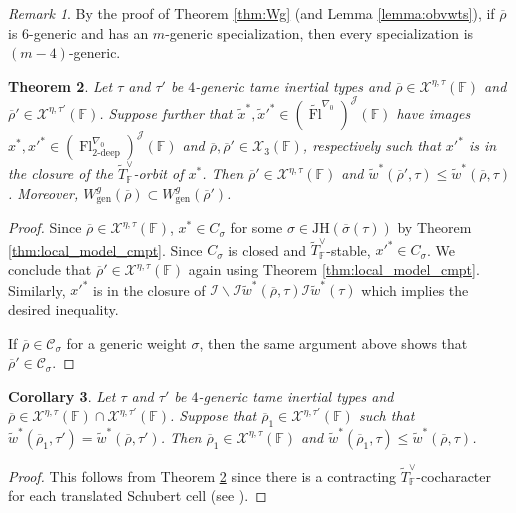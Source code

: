 \documentclass[oneside,a4paper,english, 11pt]{amsart}
\theoremstyle{plain}
\newtheorem{thm}{Theorem}[subsection]
\theoremstyle{plain}
\theoremstyle{plain}
\theoremstyle{plain}
\theoremstyle{plain}
\theoremstyle{plain}
\newtheorem{cor}[thm]{Corollary}
\theoremstyle{definition}
\theoremstyle{definition}
\theoremstyle{definition}
\theoremstyle{remark}
\newtheorem{rmk}[thm]{Remark}
\numberwithin{equation}{section}
\newcommand{\F}{\mathbb{F}}
\newcommand{\cC}{\mathcal{C}}
\newcommand{\cI}{\mathcal{I}}
\newcommand{\cJ}{\mathcal{J}}
\newcommand{\cX}{\mathcal{X}}
\newcommand{\tld}[1]{\widetilde{#1}}
\newcommand{\JH}{\mathrm{JH}}
\newcommand{\rhobar}{\overline{\rho}}
\newcommand{\ovl}[1]{\overline{#1}}
\DeclareMathOperator{\Fl}{Fl}
\begin{document}
\begin{rmk}\label{rmk:genbound}
By the proof of Theorem \ref{thm:Wg} (and Lemma \ref{lemma:obvwts}), if $\rhobar$ is $6$-generic and has an $m$-generic specialization, then every specialization is $(m-4)$-generic.  
\end{rmk}

\begin{thm}\label{thm:semicont}
Let $\tau$ and $\tau'$ be $4$-generic tame inertial types and $\rhobar \in \cX^{\eta,\tau}(\F)$ and $\rhobar' \in \cX^{\eta,\tau'}(\F)$. 
Suppose further that $\tld{x}^*,\tld{x}'^* \in (\tld{\Fl}^{\nabla_0})^{\cJ}(\F)$ have images $x^*,{x'}^* \in (\Fl_{2\textrm{-deep}}^{\nabla_0})^{\cJ}(\F)$ and $\rhobar,\rhobar' \in \cX_3(\F)$, respectively such that ${x'}^*$ is in the closure of the $\tld{T}^{\vee}_\F$-orbit of $x^*$. 
Then $\rhobar' \in \cX^{\eta,\tau}(\F)$ and $\tld{w}^*(\rhobar',\tau) \leq \tld{w}^*(\rhobar,\tau)$. 
Moreover, $W^g_{\mathrm{gen}}(\rhobar) \subset W^g_{\mathrm{gen}}(\rhobar')$. 
\end{thm}
\begin{proof}
Since $\rhobar \in \cX^{\eta,\tau}(\F)$, $x^*\in C_\sigma$ for some $\sigma \in \JH(\ovl{\sigma}(\tau))$ by Theorem \ref{thm:local_model_cmpt}. 
Since $C_\sigma$ is closed and $\tld{T}^{\vee}_\F$-stable, ${x'}^* \in C_\sigma$. 
We conclude that $\rhobar' \in \cX^{\eta,\tau}(\F)$ again using Theorem \ref{thm:local_model_cmpt}. 
Similarly, ${x'}^*$ is in the closure of $\cI \backslash \cI \tld{w}^*(\rhobar,\tau) \cI \tld{w}^*(\tau)$ which implies the desired inequality. 

If $\rhobar \in \cC_\sigma$ for a generic weight $\sigma$, then the same argument above shows that $\rhobar' \in \cC_\sigma$. 
\end{proof}

\begin{cor}\label{cor:semicont}
Let $\tau$ and $\tau'$ be $4$-generic tame inertial types and $\rhobar \in \cX^{\eta,\tau}(\F) \cap \cX^{\eta,\tau'}(\F)$. 
Suppose that $\rhobar_1 \in \cX^{\eta,\tau'}(\F)$ such that $\tld{w}^*(\rhobar_1,\tau') = \tld{w}^*(\rhobar,\tau')$. 
Then $\rhobar_1 \in \cX^{\eta,\tau}(\F)$ and $\tld{w}^*(\rhobar_1,\tau) \leq \tld{w}^*(\rhobar,\tau)$. 
\end{cor}
\begin{proof}
This follows from Theorem \ref{thm:semicont} since there is a contracting $\tld{T}_\F^\vee$-cocharacter for each translated Schubert cell (see \cite[Lemma 3.4.7]{MLM}). 
\end{proof}
%
%
\end{document}
